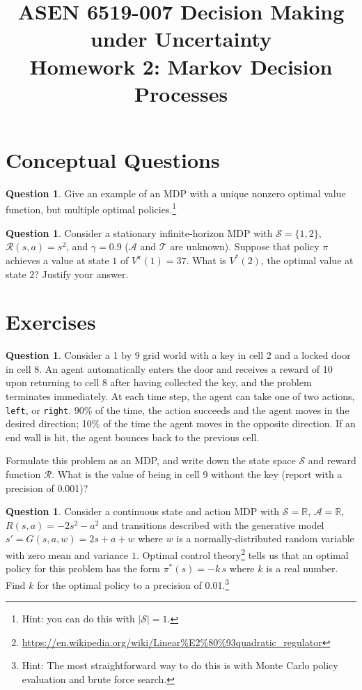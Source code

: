 \documentclass{article}
\title{ASEN 6519-007 Decision Making under Uncertainty\\
       Homework 2: Markov Decision Processes}
\theoremstyle{definition}
\newtheorem{question}[thm]{Question}
\newcommand{\reals}{\mathbb{R}}
\begin{document}
\maketitle

\section{Conceptual Questions}

\begin{question}
    Give an example of an MDP with a unique nonzero optimal value function, but multiple optimal policies.\footnote{Hint: you can do this with $|\mathcal{S}| = 1$.}
\end{question}

\begin{question}
    Consider a stationary infinite-horizon MDP with $\mathcal{S} = \{1,2\}$, $\mathcal{R}(s, a) = s^2$, and $\gamma = 0.9$ ($\mathcal{A}$ and $\mathcal{T}$ are unknown). Suppose that policy $\pi$ achieves a value at state $1$ of $V^\pi(1) = 37$. What is $V^*(2)$, the optimal value at state $2$? Justify your answer.
\end{question}

\section{Exercises}

\begin{question}
    Consider a 1 by 9 grid world with a key in cell 2 and a locked door in cell 8. An agent automatically enters the door and receives a reward of 10 upon returning to cell 8 after having collected the key, and the problem terminates immediately. At each time step, the agent can take one of two actions, \texttt{left}, or \texttt{right}. 90\% of the time, the action succeeds and the agent moves in the desired direction; 10\% of the time the agent moves in the opposite direction. If an end wall is hit, the agent bounces back to the previous cell.

    Formulate this problem as an MDP, and write down the state space $\mathcal{S}$ and reward function $\mathcal{R}$. What is the value of being in cell 9 without the key (report with a precision of 0.001)?

\end{question}

\begin{question}

    Consider a continuous state and action MDP with $\mathcal{S} = \reals$, $\mathcal{A} = \reals$, $R(s, a) = - 2s^2 - a^2$ and transitions described with the generative model $s' = G(s, a, w) = 2s + a + w$ where $w$ is a normally-distributed random variable with zero mean and variance $1$. Optimal control theory\footnote{\url{https://en.wikipedia.org/wiki/Linear\%E2\%80\%93quadratic_regulator}} tells us that an optimal policy for this problem has the form $\pi^*(s) = -k\,s$ where $k$ is a real number. Find $k$ for the optimal policy to a precision of 0.01.\footnote{Hint: The most straightforward way to do this is with Monte Carlo policy evaluation and brute force search.}
\end{question}
\end{document}
